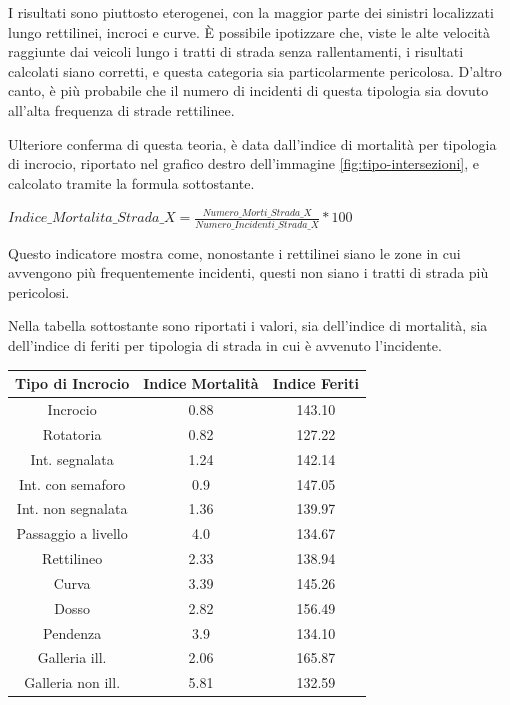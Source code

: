 \documentclass[a4paper,12pt]{report}
\begin{document}
I risultati sono piuttosto eterogenei, con la maggior parte dei sinistri 
localizzati lungo rettilinei, incroci e curve. 
\`E possibile ipotizzare che, viste le alte velocità raggiunte dai veicoli 
lungo i tratti di strada senza rallentamenti, i risultati calcolati siano corretti, 
e questa categoria sia particolarmente pericolosa. 
D'altro canto, è più probabile che il numero di incidenti di questa tipologia sia dovuto 
all'alta frequenza di strade rettilinee. 

Ulteriore conferma di questa teoria, è data dall'indice di mortalità per tipologia di incrocio, 
riportato nel grafico destro dell'immagine \ref{fig:tipo-intersezioni}, e calcolato tramite la 
formula sottostante. 

\begin{center}
    $Indice\_Mortalita\_Strada\_X = \displaystyle \frac{Numero\_Morti\_Strada\_X}{Numero\_Incidenti\_Strada\_X} * 100$ 
\end{center}

Questo indicatore mostra come, nonostante i rettilinei siano le zone in cui 
avvengono più frequentemente incidenti, questi non siano i tratti di 
strada più pericolosi. 

Nella tabella sottostante sono riportati i valori, sia dell'indice di mortalità, 
sia dell'indice di feriti per tipologia di strada in cui è avvenuto l'incidente. 

\begin{center}
    \def\arraystretch{1.5}%
    \begin{tabular}{ |c|c|c| } 
    \hline
    Tipo di Incrocio & Indice Mortalità & Indice Feriti \\ 
    \hline
    \rowcolor{TableGray}
    Incrocio                & 0.88 & 143.10 \\
    Rotatoria               & 0.82 & 127.22 \\
    \rowcolor{TableGray}
    Int. segnalata          & 1.24 & 142.14 \\
    Int. con semaforo       & 0.9 & 147.05 \\
    \rowcolor{TableGray}
    Int. non segnalata      & 1.36 & 139.97\\
    Passaggio a livello     & 4.0 & 134.67\\
    \rowcolor{TableGray}
    Rettilineo              & 2.33 & 138.94\\
    Curva                   & 3.39 & 145.26\\
    \rowcolor{TableGray}
    Dosso                   & 2.82 & 156.49\\
    Pendenza                & 3.9 & 134.10\\
    \rowcolor{TableGray}
    Galleria ill.           & 2.06 & 165.87\\
    Galleria non ill.       & 5.81 & 132.59\\
    \hline
    \end{tabular}
\end{center}
\end{document}

